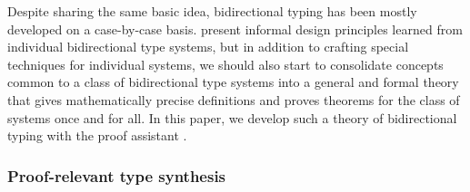 
Despite sharing the same basic idea, bidirectional typing has been mostly developed on a case-by-case basis.
\citeauthor{Dunfield2021} present informal design principles learned from individual bidirectional type systems, but in addition to crafting special techniques for individual systems, we should also start to consolidate concepts common to a class of bidirectional type systems into a general and formal theory that gives mathematically precise definitions and proves theorems for the class of systems once and for all.
In this paper, we develop such a theory of bidirectional typing with the proof assistant \Agda.

\subsubsection{Proof-relevant type synthesis}
\label{sec:PLFA}

